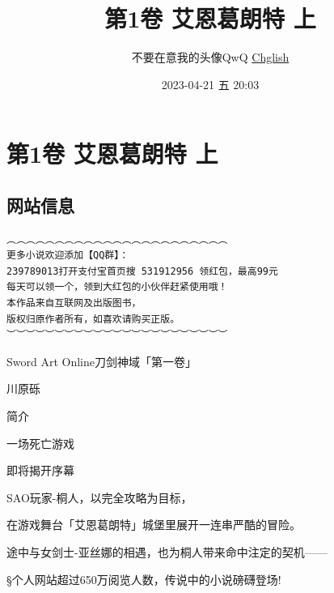\documentclass[11pt]{book}
\author{不要在意我的头像QwQ \href{https://youlanjie.github.io/}{Chglish}}
\date{2023-04-21 五 20:03}
\title{第1卷 艾恩葛朗特 上}
\begin{document}
\maketitle
\tableofcontents


\part{第1卷 艾恩葛朗特 上}
\label{sec:orgde91f30}
\chapter{网站信息}
\label{sec:orgb04d907}
\begin{verbatim}
︵︵︵︵︵︵︵︵︵︵︵︵︵︵︵︵︵︵︵︵︵︵︵
更多小说欢迎添加【QQ群】：
239789013打开支付宝首页搜 531912956 领红包，最高99元
每天可以领一个，领到大红包的小伙伴赶紧使用哦！
本作品来自互联网及出版图书，
版权归原作者所有，如喜欢请购买正版。
︶︶︶︶︶︶︶︶︶︶︶︶︶︶︶︶︶︶︶︶︶︶︶
\end{verbatim}

Sword Art Online刀剑神域「第一卷」

川原砾
\begin{center}
简介

一场死亡游戏

即将揭开序幕

SAO玩家-桐人，以完全攻略为目标，

在游戏舞台「艾恩葛朗特」城堡里展开一连串严酷的冒险。

途中与女剑士-亚丝娜的相遇，也为桐人带来命中注定的契机——

§个人网站超过650万阅览人数，传说中的小说磅礴登场!
\end{center}
\end{document}
